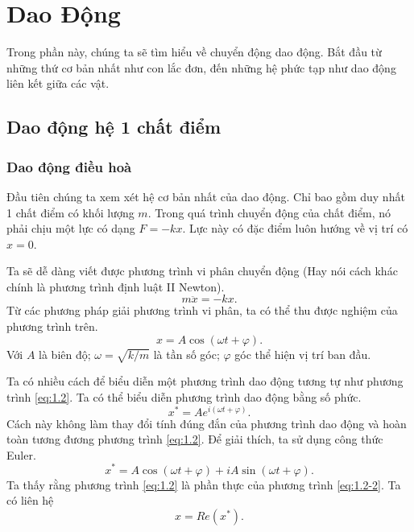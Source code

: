   
\chapter{Dao Động}

Trong phần này, chúng ta sẽ tìm hiểu về chuyển động dao động. Bắt đầu từ những thứ cơ bản nhất như con lắc đơn, đến những hệ phức tạp như dao động liên kết giữa các vật. 




\section{Dao động hệ 1 chất điểm}
\subsection{Dao động điều hoà}
Đầu tiên chúng ta xem xét hệ cơ bản nhất của dao động. Chỉ bao gồm duy nhất 1 chất điểm có khối lượng \(m\). Trong quá trình chuyển động của chất điểm, nó phải chịu một lực có dạng \(F = - k x\). Lực này có đặc điểm luôn hướng về vị trí có \(x = 0\). 

\begin{figure}[!htb]
    \centering
    
    \caption{}
    \label{fig:1.1}
\end{figure}

Ta sẽ dễ dàng viết được phương trình vi phân chuyển động (Hay nói cách khác chính là phương trình định luật II Newton).
\begin{equation}
    m \ddot{x} = -kx.
    \label{eq:1.1}
\end{equation}
Từ các phương pháp giải phương trình vi phân, ta có thể thu được nghiệm của phương trình trên.
\begin{equation}
    x = A \cos{ \left(\omega t + \varphi \right)}.
    \label{eq:1.2}
\end{equation}
Với \(A\) là biên độ; \(\omega = \sqrt{k/m}\) là tần số góc; \(\varphi\) góc thể hiện vị trí ban đầu. 
\vspace{4mm}

Ta có nhiều cách để biểu diễn một phương trình dao động tương tự như phương trình \ref{eq:1.2}. Ta có thể biểu diễn phương trình dao động bằng số phức.
\begin{equation}
    x^* = A e^{i \left( \omega t + \varphi \right)}.
    \label{eq:1.2-2}
\end{equation}
Cách này không làm thay đổi tính đúng đắn của phương trình dao động và hoàn toàn tương đương phương trình \ref{eq:1.2}. Để giải thích, ta sử dụng công thức Euler.
\begin{equation*}
    x^* = A \cos{\left( \omega t + \varphi \right)} + i A \sin{\left( \omega t + \varphi \right)}.
\end{equation*}
Ta thấy rằng phương trình \ref{eq:1.2} là phần thực của phương trình \ref{eq:1.2-2}. Ta có liên hệ
\begin{equation}
    x = Re (x^*).
\end{equation}
